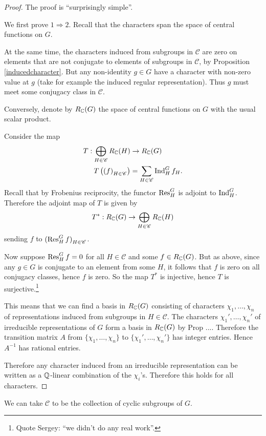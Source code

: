 \documentclass[11pt, english]{article}
\begin{document}
\begin{proof}
The proof is ``surprisingly simple''.

We first prove $1 \Rightarrow 2$. Recall that the characters span the space of central functions on $G$.

At the same time, the characters induced from subgroups in $\mathscr C$ are zero on elements that are not conjugate to elements of subgroups in $\mathscr C$, by Proposition \ref{inducedcharacter}. But any non-identity $g \in G$ have a character with non-zero value at $g$ (take for example the induced regular representation). Thus $g$ must meet some conjugacy class in $\mathscr C$.

Conversely, denote by $R_{\mathbb{C}}(G)$ the space of central functions on $G$ with the usual scalar product.

Consider the map
\begin{align*}
  T: \bigoplus_{H \in \mathscr C} R_{\mathbb{C}}(H) &\to R_{\mathbb{C}}(G) \\
 T\left( {(f)}_{H \in \mathscr C} \right) &= \sum_{H \in \mathscr C} \operatorname{Ind}_H^G f_H.
\end{align*}
Recall that by Frobenius reciprocity, the functor $\operatorname{Res}_H^G$ is adjoint to $\operatorname{Ind}_H^G$. Therefore the adjoint map of $T$ is given by 
$$
T^\ast : R_{\mathbb{C}}(G) \to \bigoplus_{H \in \mathscr C} R_{\mathbb{C}}(H)
$$
sending $f$ to ${(\operatorname{Res}_H^G f)}_{H \in \mathscr C}$. 

Now suppose $\operatorname{Res}_H^G f = 0$ for all $H \in \mathscr C$ and some $f \in R_{\mathbb{C}}(G)$. But as above, since any $g \in G$ is conjugate to an element from some $H$, it follows that $f$ is zero on all conjugacy classes, hence $f$ is zero. So the map $T^ \ast$ is injective, hence $T$ is surjective.\footnote{Quote Sergey: ``we didn't do any real work''.}

This means that we can find a basis in $R_{\mathbb{C}}(G)$ consisting of characters $\chi_1,\ldots,\chi_n$ of representations induced from subgroups in $H \in \mathscr C$. The characters $\chi_1',\ldots, \chi_n'$ of irreducible representations of $G$ form a basis in $R_{\mathbb{C}}(G)$ by Prop .... Therefore the transition matrix $A$ from $\{ \chi_1,\ldots, \chi_n \}$ to $\{ \chi_1',\ldots,\chi_n' \}$ has integer entries. Hence $A^{-1}$ has rational entries.

Therefore any character induced from an irreducible representation can be written as a $\mathbb{Q}$-linear combination of the $\chi_i$'s. Therefore this holds for all characters.
\end{proof}

We can take $\mathscr C$ to be the collection of cyclic subgroups of $G$.
\end{document}
